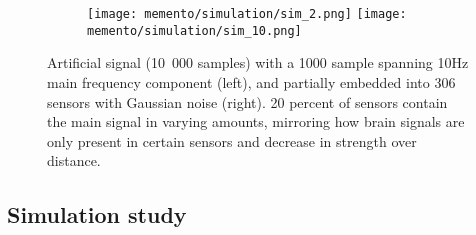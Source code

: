 \begin{figure}[H]
	\begin{subfigure}{1\textwidth}
		\centering
		\texttt{[image: memento/simulation/sim\_2.png]}
		\texttt{[image: memento/simulation/sim\_10.png]}
	\end{subfigure}
	\caption[Artificial signal for simulation]{Artificial signal (10~000 samples) with a 1000 sample spanning 10Hz main frequency component (left), and partially embedded into 306 sensors with Gaussian noise (right). 20 percent of sensors contain the main signal in varying amounts, mirroring how brain signals are only present in certain sensors and decrease in strength over distance.}
	\label{fig:sim_artificial_signal}
\end{figure}

\subsection{Simulation study}


